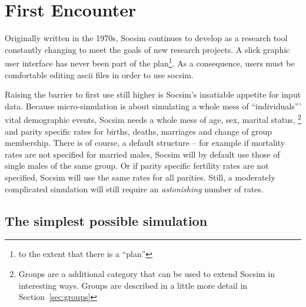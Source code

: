 
\section{First Encounter}
\label{sec:firstEncounter}



Originally written in the 1970s, Socsim continues to develop as a research tool
constantly changing to meet the goals of new research projects.  A slick
graphic user interface has never been part of the plan\footnote{to the
  extent that there is a ``plan''}. As a consequence, users must be
comfortable editing ascii files in order to use socsim.

Raising the barrier to first use still higher is Socsim's insatiable
appetite for input data. Because micro-simulation is about simulating a
whole mess of ``individuals''' vital demographic events, Socsim needs a
whole mess of age, sex, marital status, \footnote{Groups
  are a additional category that can be used to extend Socsim in
  interesting ways. Groups are described in a little more detail in Section~\ref{sec:groups}} and parity specific rates
for births, deaths, marriages and change of group membership. There is
of course, a default structure -- for example if mortality rates are
not specified for married males, Socsim will by default use those of
single males of the same group.  Or if parity specific fertility rates
are not specified, Socsim will use the same rates for all
parities. Still, a moderately complicated simulation will still require
an \emph{astonishing} number of rates.

\subsection{The simplest possible simulation}
\label{sec:simplest}

